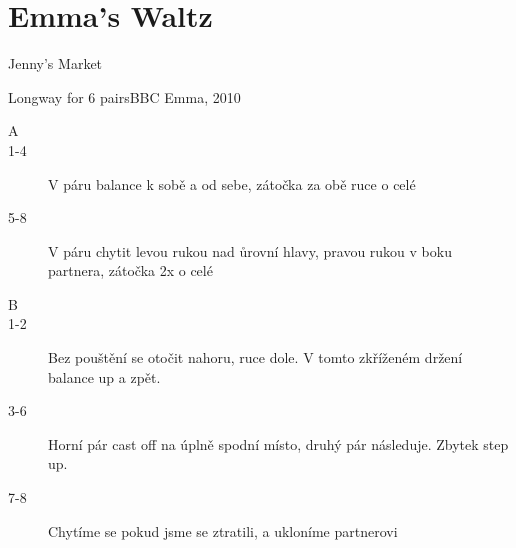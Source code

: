 \chapter{Emma's Waltz}
\begin{center}
    {\large Jenny's Market}
\end{center}
{\large Longway for 6 pairs\hfill BBC Emma, 2010}

\begin{description}
    \item[A]
    \item[1-4]V páru balance k sobě a od sebe, zátočka za obě ruce o celé
    \item[5-8]V páru chytit levou rukou nad ůrovní hlavy, pravou rukou v boku partnera, zátočka 2x o celé
    \item[B]
    \item[1-2]Bez pouštění se otočit nahoru, ruce dole. V tomto zkříženém držení balance up a zpět.
    \item[3-6]Horní pár cast off na úplně spodní místo, druhý pár následuje. Zbytek step up.
    \item[7-8]Chytíme se pokud jsme se ztratili, a ukloníme partnerovi
\end{description}